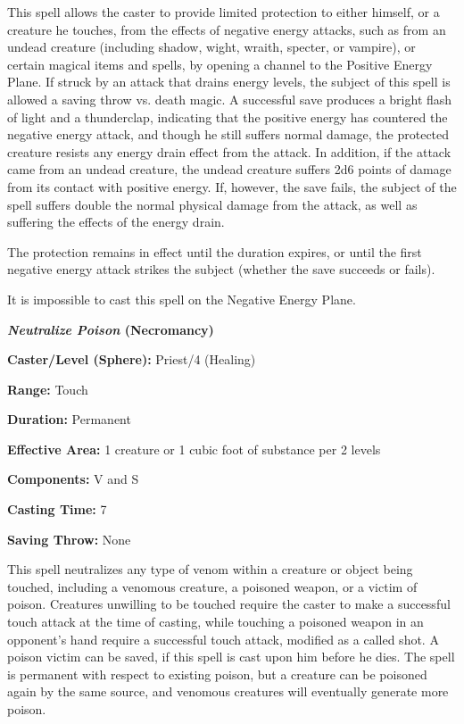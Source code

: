 \begin{multicols}{2}
This spell allows the caster to provide limited protection to either himself, or a creature he touches, from the effects of negative energy attacks, such as from an undead creature (including shadow, wight, wraith, specter, or vampire), or certain magical items and spells, by opening a channel to the Positive Energy Plane.  If struck by an attack that drains energy levels, the subject of this spell is allowed a saving throw vs. death magic.   A successful save produces a bright flash of light and a thunderclap, indicating that the positive energy has countered the negative energy attack, and though he still suffers normal damage, the protected creature resists any energy drain effect from the attack.  In addition, if the attack came from an undead creature, the undead creature suffers 2d6 points of damage from its contact with positive energy.  If, however, the save fails, the subject of the spell suffers double the normal physical damage from the attack, as well as suffering the effects of the energy drain.

The protection remains in effect until the duration expires, or until the first negative energy attack strikes the subject (whether the save succeeds or fails).

It is impossible to cast this spell on the Negative Energy Plane.

\vspace{1em}

\noindent
\begin{minipage}{\columnwidth}

\noindent \textbf{\textit{Neutralize Poison} (Necromancy)}

\noindent \textbf{Caster/Level (Sphere):} Priest/4 (Healing)

\noindent \textbf{Range:} Touch

\noindent \textbf{Duration:} Permanent

\noindent \textbf{Effective Area:} 1 creature or 1 cubic foot of substance per 2 levels

\noindent \textbf{Components:} V and S

\noindent \textbf{Casting Time:} 7

\noindent \textbf{Saving Throw:} None

\end{minipage}

This spell neutralizes any type of venom within a creature or object being touched, including a venomous creature, a poisoned weapon, or a victim of poison.  Creatures unwilling to be touched require the caster to make a successful touch attack at the time of casting, while touching a poisoned weapon in an opponent's hand require a successful touch attack, modified as a called shot.  A poison victim can be saved, if this spell is cast upon him before he dies.  The spell is permanent with respect to existing poison, but a creature can be poisoned again by the same source, and venomous creatures will eventually generate more poison.


\end{multicols}
